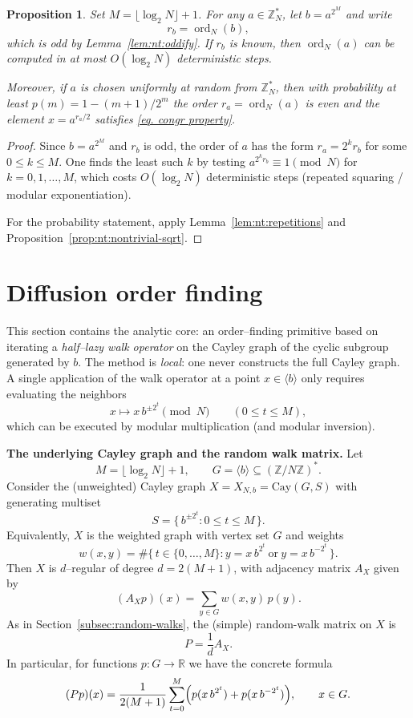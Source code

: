\documentclass[11pt,reqno]{article}
\numberwithin{equation}{section}
\theoremstyle{plain}
\newtheorem{proposition}[theorem]{Proposition}
\theoremstyle{definition}
\theoremstyle{remark}
\newcommand{\R}{\mathbb{R}}
\newcommand{\Z}{\mathbb{Z}}
\begin{document}
\medskip
\begin{proposition}\label{prop:nt:factoring-to-order}
Set $M=\lfloor\log_2 N\rfloor+1$.  For any $a\in\mathbb{Z}_N^\ast$, let $b=a^{2^M}$ and write
\[
r_b=\operatorname{ord}_N(b),
\]
which is odd by Lemma~\ref{lem:nt:oddify}.  If $r_b$ is known, then $\operatorname{ord}_N(a)$ can be computed in at most
$O(\log_2 N)$ deterministic steps.

Moreover, if $a$ is chosen uniformly at random from $\mathbb{Z}_N^\ast$, then with probability at least
$p(m)=1-(m+1)/2^m$ the order $r_a=\operatorname{ord}_N(a)$ is even and the element $x=a^{r_a/2}$ satisfies \eqref{eq. congr property}.
\end{proposition}

\begin{proof}
Since $b=a^{2^M}$ and $r_b$ is odd, the order of $a$ has the form $r_a=2^k r_b$ for some $0\le k\le M$.
One finds the least such $k$ by testing $a^{2^k r_b}\equiv 1\pmod N$ for $k=0,1,\dots,M$, which costs $O(\log_2 N)$
deterministic steps (repeated squaring / modular exponentiation).

For the probability statement, apply Lemma~\ref{lem:nt:repetitions} and Proposition~\ref{prop:nt:nontrivial-sqrt}.
\end{proof}


\section{Diffusion order finding}
\label{4}

This section contains the analytic core: an order--finding primitive based on iterating a
\emph{half--lazy walk operator} on the Cayley graph of the cyclic subgroup generated by $b$.
The method is \emph{local}: one never constructs the full Cayley graph.
A single application of the walk operator at a point $x\in \langle b \rangle$ only requires evaluating the neighbors
\[
  x \longmapsto x\,b^{\pm 2^t}\pmod N \qquad (0\le t\le M),
\]
which can be executed by modular multiplication (and modular inversion).
\smallskip

\noindent\textbf{The underlying Cayley graph and the random walk matrix.}
Let
\[
  M=\lfloor\log_2 N\rfloor+1,
  \qquad
  G=\langle b\rangle\subseteq (\Z/N\Z)^\ast.
\]
Consider the (unweighted) Cayley graph $X=X_{N,b}=\mathrm{Cay}(G,S)$ with generating multiset
\[
  S=\{\,b^{\pm 2^t}: 0\le t\le M\,\}.
\]
Equivalently, $X$ is the weighted graph with vertex set $G$ and weights
\[
  w(x,y)=\#\bigl\{\,t\in\{0,\dots,M\}: y=x\,b^{2^t}\ \text{or}\ y=x\,b^{-2^t}\,\bigr\}.
\]
Then $X$ is $d$--regular of degree $d=2(M+1)$, with adjacency matrix $A_X$ given by
\[
  (A_X p)(x)=\sum_{y\in G} w(x,y)\,p(y).
\]
As in Section~\ref{subsec:random-walks}, the (simple) random-walk matrix on $X$ is
\[
  P=\frac{1}{d}A_X.
\]
In particular, for functions $p\colon G\to\R$ we have the concrete formula
\begin{equation}\label{eq:A-def-mult}
  (Pp)(x)= \frac{1}{2(M+1)}\sum_{t=0}^M
  \Bigl(p(x\,b^{2^t})+p(x\,b^{-2^t})\Bigr),
  \qquad x\in G.
\end{equation}
\end{document}
